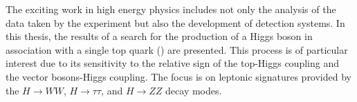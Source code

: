 The exciting work in high energy physics includes not only the analysis of the data taken by the experiment but also the development of detection systems. In this thesis, the results of a search for the production of a Higgs boson in association with a single top quark (\tH) are presented. This process is of particular interest due to its sensitivity to the relative sign of the top-Higgs coupling and the vector bosons-Higgs coupling. The focus is on leptonic signatures provided by the $H \to WW$, $H \to \tau\tau$, and $H \to ZZ$ decay modes. 





